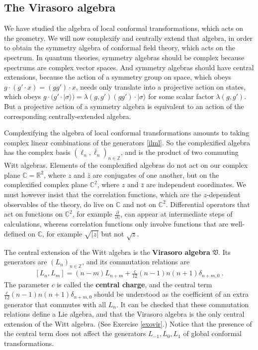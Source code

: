 \documentclass[12pt, a4paper, notitlepage, twoside]{report}
\numberwithin{equation}{section}
\theoremstyle{break}
\begin{document}
\subsection{The Virasoro algebra \label{secvir}}

We have studied the algebra of local conformal transformations, which acts on the geometry. 
We will now complexify and centrally extend that algebra, in order to obtain the symmetry algebra of conformal field theory, which acts on the spectrum. 
In quantum theories, symmetry algebras should be complex because spectrums are complex vector spaces. And symmetry algebras should have central extensions, because the action of a symmetry group on space, which obeys $g\cdot(g'\cdot x) = (gg')\cdot x$, needs only translate into a projective action on states, which obeys $g\cdot(g'\cdot|\sigma\rangle) = \lambda(g,g') (gg')\cdot |\sigma\rangle$ for some scalar factor $\lambda(g,g')$. 
But a projective action of a symmetry algebra is equivalent to an action of the corresponding centrally-extended algebra. 

Complexifying the algebra of local conformal transformations amounts to taking complex linear combinations of the generators \eqref{ilml}. So the complexified algebra has the complex basis $(\ell_n,\bar\ell_n)_{n\in\mathbb{Z}}$, and is the product of two commuting Witt algebras. Elements of the complexified algebras do not act on our complex plane $\mathbb{C}=\mathbb{R}^2$, where $z$ and $\bar z$ are conjugates of one another, but on the complexified complex plane ${\mathbb{C}}^2$, where $z$ and $\bar z$ are independent coordinates. 
We must however insist that the correlation functions, which are the $z$-dependent observables of the theory, do live on $\mathbb{C}$ and not on ${\mathbb{C}}^2$.
Differential operators that act on functions on ${\mathbb{C}}^2$, for example $\frac{\partial}{\partial z}$, can appear at intermediate steps of calculations, whereas correlation functions only involve functions that are well-defined on $\mathbb{C}$, for example $\sqrt{|z|}$ but not $\sqrt{z}$. 

The central extension of the Witt algebra is the 
\textbf{\boldmath Virasoro algebra} $\mathfrak{V}$.
Its generators are $(L_n)_{n\in {\mathbb{Z}}}$, and its commutation relations are 
\begin{align}
 \boxed{[L_n,L_m]=(n-m)L_{n+m} + \frac{c}{12} (n-1)n(n+1) \delta_{n+m,0}}\ .
\label{vir}
\end{align}
The parameter $c$ is called the \textbf{\boldmath central charge}, and the central term $\frac{c}{12} (n-1)n(n+1) \delta_{n+m,0}$ should be understood as the coefficient of an extra generator that commutes with all $L_n$.
It can be checked that these commutation relations define a Lie algebra, and that the Virasoro algebra is the only central extension of the Witt algebra. (See Exercise \ref{exovir}.) Notice that the presence of the central term does not affect the generators $L_{-1},L_0,L_1$ of global conformal transformations. 
\end{document}
